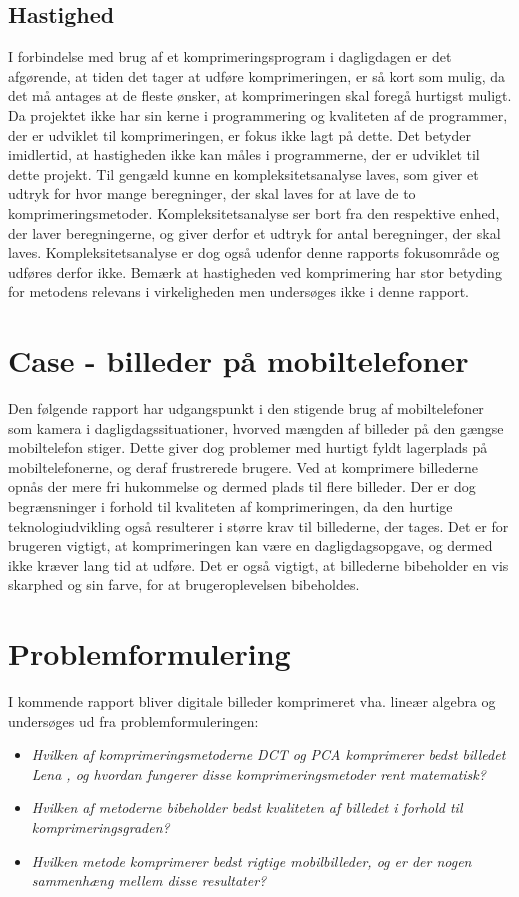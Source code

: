 \subsection*{Hastighed}
I forbindelse med brug af et komprimeringsprogram i dagligdagen er det afgørende, at tiden det tager at udføre komprimeringen, er så kort som mulig, da det må antages at de fleste ønsker, at komprimeringen skal foregå hurtigst muligt. Da projektet ikke har sin kerne i programmering og kvaliteten af de programmer, der er udviklet til komprimeringen, er fokus ikke lagt på dette. Det betyder imidlertid, at hastigheden ikke kan måles i programmerne, der er udviklet til dette projekt. Til gengæld kunne en kompleksitetsanalyse laves, som giver et udtryk for hvor mange beregninger, der skal laves for at lave de to komprimeringsmetoder. Kompleksitetsanalyse ser bort fra den respektive enhed, der laver beregningerne, og giver derfor et udtryk for antal beregninger, der skal laves. Kompleksitetsanalyse er dog også udenfor denne rapports fokusområde og udføres derfor ikke. Bemærk at hastigheden ved komprimering har stor betyding for metodens relevans i virkeligheden men undersøges ikke i denne rapport.

\section*{Case - billeder på mobiltelefoner}
Den følgende rapport har udgangspunkt i den stigende brug af mobiltelefoner som kamera i dagligdagssituationer, hvorved mængden af billeder på den gængse mobiltelefon stiger. Dette giver dog problemer med hurtigt fyldt lagerplads på mobiltelefonerne, og deraf frustrerede brugere. Ved at komprimere billederne opnås der mere fri hukommelse og dermed plads til flere billeder. Der er dog begrænsninger i forhold til kvaliteten af komprimeringen, da den hurtige teknologiudvikling også resulterer i større krav til billederne, der tages. Det er for brugeren vigtigt, at komprimeringen kan være en dagligdagsopgave, og dermed ikke kræver lang tid at udføre. Det er også vigtigt, at billederne bibeholder en vis skarphed og sin farve, for at brugeroplevelsen bibeholdes.

\section{Problemformulering}
I kommende rapport bliver digitale billeder komprimeret vha. lineær algebra og undersøges ud fra problemformuleringen: \\
\begin{itemize}
\item[] \textit{Hvilken af komprimeringsmetoderne DCT og PCA komprimerer bedst billedet Lena \citep{lena}, og hvordan fungerer disse komprimeringsmetoder rent matematisk?} \\
\item[] \textit{Hvilken af metoderne bibeholder bedst kvaliteten af billedet i forhold til komprimeringsgraden?} \\
\item[] \textit{Hvilken metode komprimerer bedst rigtige mobilbilleder, og er der nogen sammenhæng mellem disse resultater?}
\end{itemize}

